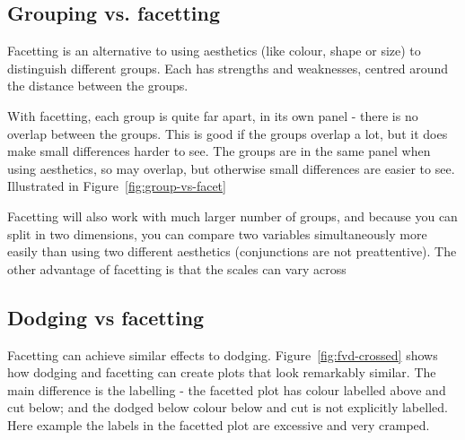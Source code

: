 \subsection{Grouping vs. facetting}
\label{sub:group-vs-facet}

Facetting is an alternative to using aesthetics (like colour, shape or size) to distinguish different groups.  Each has strengths and weaknesses, centred around the distance between the groups.

With facetting, each group is quite far apart, in its own panel - there is no overlap between the groups.  This is good if the groups overlap a lot, but it does make small differences harder to see.  The groups are in the same panel when using aesthetics, so may overlap, but otherwise small differences are easier to see.  Illustrated in Figure~\ref{fig:group-vs-facet}

Facetting will also work with much larger number of groups, and because you can split in two dimensions, you can compare two variables simultaneously more easily than using two different aesthetics (conjunctions are not preattentive).  The other advantage of facetting is that the scales can vary across 

% 
%
% 


\subsection{Dodging vs facetting}
\label{sub:dodge-vs-facet}

Facetting can achieve similar effects to dodging.  Figure~\ref{fig:fvd-crossed} shows how dodging and facetting can create plots that look remarkably similar.  The main difference is the labelling - the facetted plot has colour labelled above and cut below; and the dodged below colour below and cut is not explicitly labelled.  Here example the labels in the facetted plot are excessive and very cramped.  

